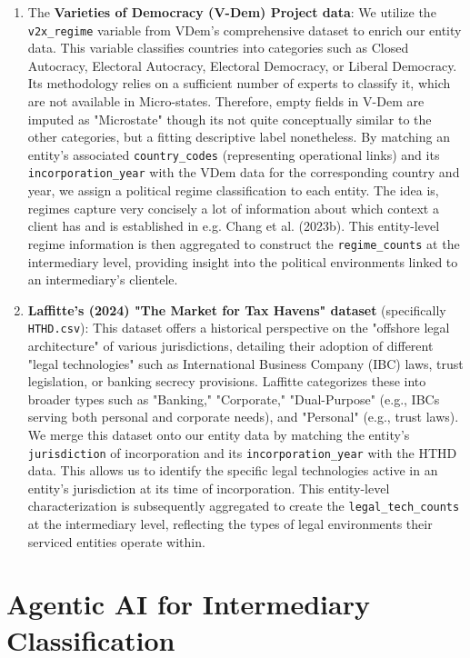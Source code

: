 \begin{enumerate}
    \item The \textbf{Varieties of Democracy (V-Dem) Project data}: We utilize the \texttt{v2x\_regime} variable from VDem's comprehensive dataset to enrich our entity data. This variable classifies countries into categories such as Closed Autocracy, Electoral Autocracy, Electoral Democracy, or Liberal Democracy. Its methodology relies on a sufficient number of experts to classify it, which are not available in Micro-states. Therefore, empty fields in V-Dem are imputed as "Microstate" though its not quite conceptually similar to the other categories, but a fitting descriptive label nonetheless. By matching an entity's associated \texttt{country\_codes} (representing operational links) and its \texttt{incorporation\_year} with the VDem data for the corresponding country and year, we assign a political regime classification to each entity. The idea is, regimes capture very concisely a lot of information about which context a client has and is established in e.g. Chang et al. (2023b). This entity-level regime information is then aggregated to construct the \texttt{regime\_counts} at the intermediary level, providing insight into the political environments linked to an intermediary's clientele.
  
  \item \textbf{Laffitte's (2024) "The Market for Tax Havens" dataset} (specifically \texttt{HTHD.csv}): This dataset offers a historical perspective on the "offshore legal architecture" of various jurisdictions, detailing their adoption of different "legal technologies" such as International Business Company (IBC) laws, trust legislation, or banking secrecy provisions. Laffitte categorizes these into broader types such as "Banking," "Corporate," "Dual-Purpose" (e.g., IBCs serving both personal and corporate needs), and "Personal" (e.g., trust laws). We merge this dataset onto our entity data by matching the entity's \texttt{jurisdiction} of incorporation and its \texttt{incorporation\_year} with the HTHD data. This allows us to identify the specific legal technologies active in an entity's jurisdiction at its time of incorporation. This entity-level characterization is subsequently aggregated to create the \texttt{legal\_tech\_counts} at the intermediary level, reflecting the types of legal environments their serviced entities operate within.
\end{enumerate}

\section{Agentic AI for Intermediary Classification}
\label{sec:3_3}

